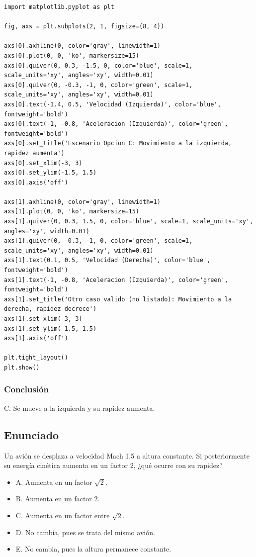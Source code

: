\documentclass[12pt, a4paper]{article}
\begin{document}
\begin{lstlisting}
import matplotlib.pyplot as plt

fig, axs = plt.subplots(2, 1, figsize=(8, 4))

axs[0].axhline(0, color='gray', linewidth=1)
axs[0].plot(0, 0, 'ko', markersize=15)
axs[0].quiver(0, 0.3, -1.5, 0, color='blue', scale=1, scale_units='xy', angles='xy', width=0.01)
axs[0].quiver(0, -0.3, -1, 0, color='green', scale=1, scale_units='xy', angles='xy', width=0.01)
axs[0].text(-1.4, 0.5, 'Velocidad (Izquierda)', color='blue', fontweight='bold')
axs[0].text(-1, -0.8, 'Aceleracion (Izquierda)', color='green', fontweight='bold')
axs[0].set_title('Escenario Opcion C: Movimiento a la izquierda, rapidez aumenta')
axs[0].set_xlim(-3, 3)
axs[0].set_ylim(-1.5, 1.5)
axs[0].axis('off')

axs[1].axhline(0, color='gray', linewidth=1)
axs[1].plot(0, 0, 'ko', markersize=15)
axs[1].quiver(0, 0.3, 1.5, 0, color='blue', scale=1, scale_units='xy', angles='xy', width=0.01)
axs[1].quiver(0, -0.3, -1, 0, color='green', scale=1, scale_units='xy', angles='xy', width=0.01)
axs[1].text(0.1, 0.5, 'Velocidad (Derecha)', color='blue', fontweight='bold')
axs[1].text(-1, -0.8, 'Aceleracion (Izquierda)', color='green', fontweight='bold')
axs[1].set_title('Otro caso valido (no listado): Movimiento a la derecha, rapidez decrece')
axs[1].set_xlim(-3, 3)
axs[1].set_ylim(-1.5, 1.5)
axs[1].axis('off')

plt.tight_layout()
plt.show()
\end{lstlisting}

\subsubsection*{Conclusión}

C. Se mueve a la izquierda y su rapidez aumenta.

\newpage

\subsection*{Enunciado}

Un avión se desplaza a velocidad Mach 1.5 a altura constante. Si posteriormente su energía cinética aumenta en un factor 2, ¿qué ocurre con su rapidez?

\begin{itemize}
    \item A. Aumenta en un factor $\sqrt{2}$.
    \item B. Aumenta en un factor $2$.
    \item C. Aumenta en un factor entre $\sqrt{2}$.
    \item D. No cambia, pues se trata del mismo avión.
    \item E. No cambia, pues la altura permanece constante.
\end{itemize}
\end{document}
